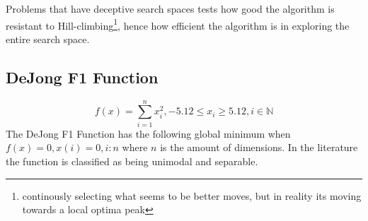 Problems that have deceptive search spaces tests how good the algorithm is resistant to Hill-climbing\footnote{continously selecting what seems to be better moves, but in reality its moving towards a local optima peak}, hence how efficient the algorithm is in exploring the entire search space\cite{evalevoalgo}.
\subsection{DeJong F1 Function}
\begin{equation}
\label{eq:DeJongF1}
	f(x) = \sum_{i=1}^n x^2_i, -5.12 \leq x_i \geq 5.12, i \in \mathbb{N}
\end{equation}
The DeJong F1 Function has the following global minimum when $f(x) = 0, x(i) = 0, i:n$ where $n$ is the amount of dimensions\cite{numericalABC,ABCCompareStudy,ARPSO,PerfABC,ContinACSTS,TestFunctions}. In the literature the function is classified as being unimodal and separable\cite{ABCCompareStudy,TestFunctions}. 

